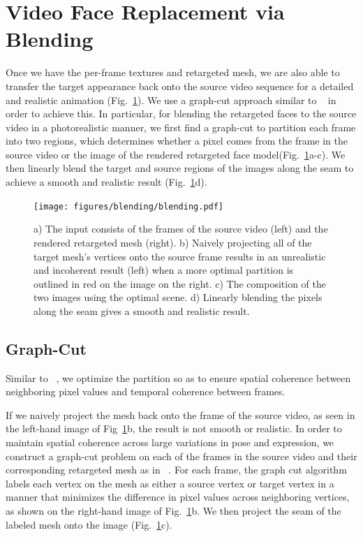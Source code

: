 

\section{Video Face Replacement via Blending}

Once we have the per-frame textures and retargeted mesh, we are also able to transfer the target appearance back onto the source video
sequence for a detailed and realistic animation (Fig.~\ref{fig:blend}). We use a graph-cut approach similar to ~\cite{replace} in order 
to achieve this.  In particular, for blending the retargeted faces to the source video in a photorealistic manner,
we first find a graph-cut to partition each frame into two regions, which determines whether 
a pixel comes from the frame in the source video or the image of the rendered retargeted face model(Fig.~\ref{fig:blend}a-c). 
We then linearly blend the target and source regions of the images along the seam to achieve a smooth and realistic result (Fig.~\ref{fig:blend}d).
 
\begin{figure}[t]
  \centering
  \texttt{[image: figures/blending/blending.pdf]}
  \caption{a) The input consists of the frames of the source video (left) and the rendered retargeted mesh (right). b) Naively projecting all of the target mesh's vertices onto the source frame results in an unrealistic and incoherent result (left) when a more optimal partition is outlined in red on the image on the right. 
	c) The composition of the two images using the optimal scene.
	d) Linearly blending the pixels along the seam gives a smooth and realistic result.}
	\label{fig:blend}
  \vspace{-0.15in}
\end{figure}



\subsection{Graph-Cut}
Similar to ~\cite{replace}, 
we optimize the partition so as to ensure spatial coherence between neighboring pixel values
and temporal coherence between frames. 


If we naively project the mesh back onto the frame of the source video, as seen in the left-hand image of Fig~\ref{fig:blend}b, the result is not smooth or realistic. 
In order to maintain spatial coherence across large variations in pose and expression, 
 we construct a graph-cut problem on each of the frames in the source video and their corresponding retargeted mesh as in ~\cite{graphcut}. For each frame, the graph cut algorithm labels each vertex on the mesh as either a source vertex or target vertex in a manner that minimizes the difference in pixel values across neighboring vertices, as shown on the right-hand image of Fig.~\ref{fig:blend}b. We then project the seam of the labeled mesh onto the image (Fig.~\ref{fig:blend}c). 

